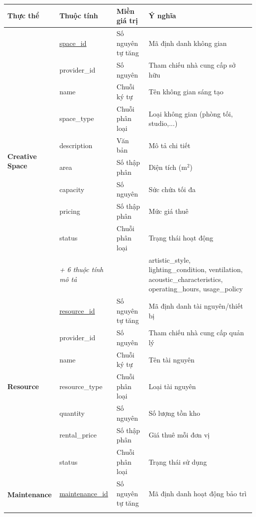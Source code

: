 \begin{table}[htbp]
    \centering
    \label{tab:data_dictionary_2}
    \renewcommand{\arraystretch}{1.3}
    \scriptsize
    \begin{tabular}{|l|l|l|p{5.5cm}|}
        \hline
        \textbf{Thực thể} & \textbf{Thuộc tính} & \textbf{Miền giá trị} & \textbf{Ý nghĩa} \\ \hline
        \multirow{10}{*}{\textbf{Creative Space}}
        & \underline{space\_id} & Số nguyên tự tăng & Mã định danh không gian \\ \cline{2-4}
        & provider\_id & Số nguyên & Tham chiếu nhà cung cấp sở hữu \\ \cline{2-4}
        & name & Chuỗi ký tự & Tên không gian sáng tạo \\ \cline{2-4}
        & space\_type & Chuỗi phân loại & Loại không gian (phòng tối, studio,...) \\ \cline{2-4}
        & description & Văn bản & Mô tả chi tiết \\ \cline{2-4}
        & area & Số thập phân & Diện tích (m$^2$) \\ \cline{2-4}
        & capacity & Số nguyên & Sức chứa tối đa \\ \cline{2-4}
        & pricing & Số thập phân & Mức giá thuê \\ \cline{2-4}
        & status & Chuỗi phân loại & Trạng thái hoạt động \\ \cline{2-4}
        & \textit{+ 6 thuộc tính mô tả} & & artistic\_style, lighting\_condition, ventilation, acoustic\_characteristics, operating\_hours, usage\_policy \\ \hline
        \multirow{7}{*}{\textbf{Resource}}
        & \underline{resource\_id} & Số nguyên tự tăng & Mã định danh tài nguyên/thiết bị \\ \cline{2-4}
        & provider\_id & Số nguyên & Tham chiếu nhà cung cấp quản lý \\ \cline{2-4}
        & name & Chuỗi ký tự & Tên tài nguyên \\ \cline{2-4}
        & resource\_type & Chuỗi phân loại & Loại tài nguyên \\ \cline{2-4}
        & quantity & Số nguyên & Số lượng tồn kho \\ \cline{2-4}
        & rental\_price & Số thập phân & Giá thuê mỗi đơn vị \\ \cline{2-4}
        & status & Chuỗi phân loại & Trạng thái sử dụng \\ \hline
        \multirow{6}{*}{\textbf{Maintenance}}
        & \underline{maintenance\_id} & Số nguyên tự tăng & Mã định danh hoạt động bảo trì \\ \cline{2-4}

\end{tabular}
\end{table}
